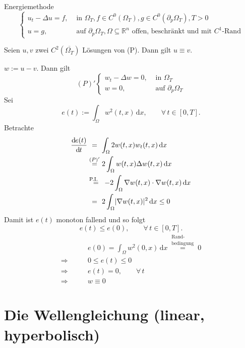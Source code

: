 Energiemethode 
\[
	\begin{cases}
		u_t - \Delta u = f, &\text{ in }\Omega_T, f \in C^0(\Omega_T), g \in C^0(\partial_p \Omega_T), T >0\\
		u = g ,&\text{ auf } \partial_p \Omega_T, \Omega \subseteq \mathbb{R}^n \text{ offen, beschränkt und mit $C^1$-Rand}
	\end{cases}
\]
\begin{satz}
	Seien $u,v$ zwei $C^2(\overline{\Omega_T})$ Lösungen von (P). Dann gilt $u \equiv v$.
\end{satz}
\begin{beweis}
	$w:= u -v$. Dann gilt 
	\[
		(P)'\begin{cases}
			w_t -\Delta w = 0, &\text{ in }\Omega_T\\
			w = 0, &\text{ auf } \partial_p \Omega_T
		\end{cases}
	\]
	Sei
	\[
		e(t):= \int_{\Omega}^{} w^2(t,x) \,\mathrm{d}x, \qquad \forall\, t \in [0,T].
	\]
	Betrachte
	\begin{align*}
		\frac{\mathrm{d}\mkern-1.0mu e(t)}{\mathrm{d}\mkern-1.0mu t}  & \stackrel{\hphantom{(P)'}}{=} \int_{\Omega}^{} 2 w(t,x) w_t(t,x) \,\mathrm{d}x  \\
		&\stackrel{(P)'}{=} 2 \int_{\Omega}^{} w(t,x) \Delta w(t,x) \,\mathrm{d}x \\
		&\stackrel{\text{P.I.\hphantom{...}}}{=} -2 \int_{\Omega}^{}  \nabla  w(t,x) \cdot  \nabla w(t,x) \,\mathrm{d}x \\
		&\stackrel{\hphantom{(P)'}}{=} 2 \int_{\Omega}^{} \lvert \nabla w(t,x)\rvert^2 \,\mathrm{d}x \leq 0
	\end{align*}
	Damit ist $e(t)$ monoton fallend und so folgt
	\[
		e(t) \leq e(0), \qquad \forall\, t \in [0,T].
	\]
	\begin{align*}
		& \qquad e(0) = \int_{\Omega}^{} w^2(0,x) \,\mathrm{d}x \stackrel{\substack{\text{Rand-}\\\text{bedingung}}}{=} 0 \\
		\Rightarrow& \qquad 0 \leq e(t) \leq 0 \\
		\Rightarrow & \qquad  e(t) = 0, \qquad \forall\, t \\
		\Rightarrow & \qquad  w \equiv 0  
	\end{align*}
\end{beweis}

\section{Die Wellengleichung (linear, hyperbolisch)} 
\label{sec:die_wellengleichung_linear_hyperbolisch}

